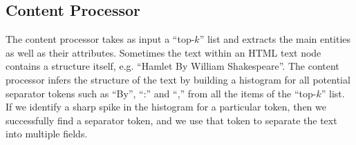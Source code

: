 \subsection{Content Processor}
The content processor takes as input a ``top-$k$'' list and 
extracts the main entities as well
as their attributes. 
Sometimes the text within an HTML text node contains a structure itself, e.g.
``Hamlet By William Shakespeare''. 
The content processor infers the structure of
the text \cite{Fisher08:dirttoshovels} by building a histogram for
all potential separator tokens such as ``By'', ``:'' and ``,'' from all the items
of the ``top-$k$'' list. If we identify a sharp spike in the histogram for a 
particular token, then we successfully find a separator token, and we use that
token to separate the text into multiple fields. 


